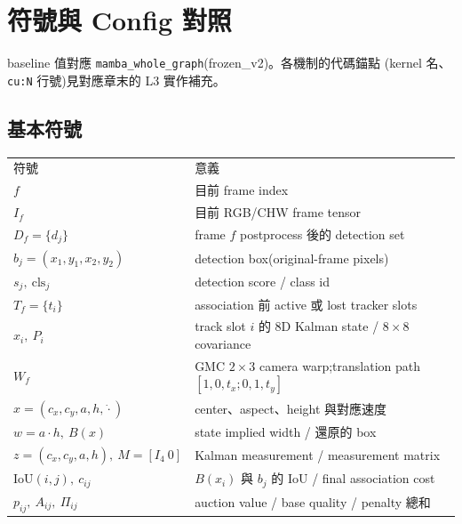 \chapter{符號與 Config 對照}\label{app:symbols}

baseline 值對應 \texttt{mamba\_whole\_graph}(frozen\_v2)。各機制的代碼錨點
(kernel 名、\texttt{cu:N} 行號)見對應章末的 L3 實作補充。

\section{基本符號}\label{app:basic}

\begin{longtable}{@{}>{\raggedright\arraybackslash}p{3.3cm}
  >{\raggedright\arraybackslash}p{8.2cm}@{}}
\toprule
符號 & 意義 \\* \midrule \endhead
\(f\) & 目前 frame index \\
\(I_f\) & 目前 RGB/CHW frame tensor \\
\(D_f=\{d_j\}\) & frame \(f\) postprocess 後的 detection set \\
\(b_j=(x_1,y_1,x_2,y_2)\) & detection box(original-frame pixels) \\
\(s_j,\ \mathrm{cls}_j\) & detection score / class id \\
\(T_f=\{t_i\}\) & association 前 active 或 lost tracker slots \\
\(x_i,\ P_i\) & track slot \(i\) 的 8D Kalman state / \(8\times8\) covariance \\
\(W_f\) & GMC \(2\times3\) camera warp;translation path \([1,0,t_x;0,1,t_y]\) \\
\midrule
\(x=(c_x,c_y,a,h,\dot{\cdot})\) & center、aspect、height 與對應速度 \\
\(w=a\cdot h,\ B(x)\) & state implied width / 還原的 box \\
\(z=(c_x,c_y,a,h),\ M=[I_4\ 0]\) & Kalman measurement / measurement matrix \\
\(\mathrm{IoU}(i,j),\ c_{ij}\) & \(B(x_i)\) 與 \(b_j\) 的 IoU / final association cost \\
\(p_{ij},\ A_{ij},\ \Pi_{ij}\) & auction value / base quality / penalty 總和 \\
\bottomrule
\end{longtable}

